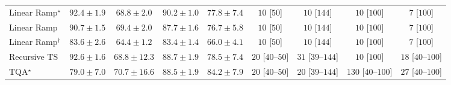 \begin{tabular}{l|cccc|cccc|}
Linear Ramp$^\star$ & {\cellcolor[HTML]{702806}} \color[HTML]{F1F1F1} $92.4\pm 1.9$ & {\cellcolor[HTML]{FEB541}} \color[HTML]{000000} $68.8\pm 2.0$ & {\cellcolor[HTML]{842E05}} \color[HTML]{F1F1F1} $90.2\pm 1.0$ & {\cellcolor[HTML]{EA6E13}} \color[HTML]{F1F1F1} $77.8\pm 7.4$ & {\cellcolor[HTML]{FFF7F3}} \color[HTML]{000000} $10$ [$50$] & {\cellcolor[HTML]{FFF7F3}} \color[HTML]{000000} $10$ [$144$] & {\cellcolor[HTML]{FFF7F3}} \color[HTML]{000000} $10$ [$100$] & {\cellcolor[HTML]{FFF7F3}} \color[HTML]{000000} $7$ [$100$] \\
Linear Ramp & {\cellcolor[HTML]{802D05}} \color[HTML]{F1F1F1} $90.7\pm 1.5$ & {\cellcolor[HTML]{FEAF3D}} \color[HTML]{000000} $69.4\pm 2.0$ & {\cellcolor[HTML]{9C3604}} \color[HTML]{F1F1F1} $87.7\pm 1.6$ & {\cellcolor[HTML]{EE7617}} \color[HTML]{F1F1F1} $76.7\pm 5.8$ & {\cellcolor[HTML]{FFF7F3}} \color[HTML]{000000} $10$ [$50$] & {\cellcolor[HTML]{FFF7F3}} \color[HTML]{000000} $10$ [$144$] & {\cellcolor[HTML]{FFF7F3}} \color[HTML]{000000} $10$ [$100$] & {\cellcolor[HTML]{FFF7F3}} \color[HTML]{000000} $7$ [$100$] \\
Linear Ramp$^\dagger$ & {\cellcolor[HTML]{C44802}} \color[HTML]{F1F1F1} $83.6\pm 2.6$ & {\cellcolor[HTML]{FED36F}} \color[HTML]{000000} $64.4\pm 1.2$ & {\cellcolor[HTML]{C64902}} \color[HTML]{F1F1F1} $83.4\pm 1.4$ & {\cellcolor[HTML]{FEC95B}} \color[HTML]{000000} $66.0\pm 4.1$ & {\cellcolor[HTML]{FFF7F3}} \color[HTML]{000000} $10$ [$50$] & {\cellcolor[HTML]{FFF7F3}} \color[HTML]{000000} $10$ [$144$] & {\cellcolor[HTML]{FFF7F3}} \color[HTML]{000000} $10$ [$100$] & {\cellcolor[HTML]{FFF7F3}} \color[HTML]{000000} $7$ [$100$] \\
Recursive TS & {\cellcolor[HTML]{6C2706}} \color[HTML]{F1F1F1} $92.6\pm 1.6$ & {\cellcolor[HTML]{FEB541}} \color[HTML]{000000} $68.8\pm 12.3$ & {\cellcolor[HTML]{933204}} \color[HTML]{F1F1F1} $88.7\pm 1.9$ & {\cellcolor[HTML]{E56910}} \color[HTML]{F1F1F1} $78.5\pm 7.4$ & {\cellcolor[HTML]{FFF4F0}} \color[HTML]{000000} $20$ [$40$--$50$] & {\cellcolor[HTML]{FFF2EE}} \color[HTML]{000000} $31$ [$39$--$144$] & {\cellcolor[HTML]{FFF7F3}} \color[HTML]{000000} $10$ [$100$] & {\cellcolor[HTML]{FFF5F1}} \color[HTML]{000000} $18$ [$40$--$100$] \\
TQA$^\star$ & {\cellcolor[HTML]{E2650F}} \color[HTML]{F1F1F1} $79.0\pm 7.0$ & {\cellcolor[HTML]{FEA634}} \color[HTML]{000000} $70.7\pm 16.6$ & {\cellcolor[HTML]{943304}} \color[HTML]{F1F1F1} $88.5\pm 1.9$ & {\cellcolor[HTML]{BE4503}} \color[HTML]{F1F1F1} $84.2\pm 7.9$ & {\cellcolor[HTML]{FFF4F0}} \color[HTML]{000000} $20$ [$40$--$50$] & {\cellcolor[HTML]{FFF4F0}} \color[HTML]{000000} $20$ [$39$--$144$] & {\cellcolor[HTML]{FDDBD7}} \color[HTML]{000000} $130$ [$40$--$100$] & {\cellcolor[HTML]{FFF3EF}} \color[HTML]{000000} $27$ [$40$--$100$] \\

\end{tabular}
